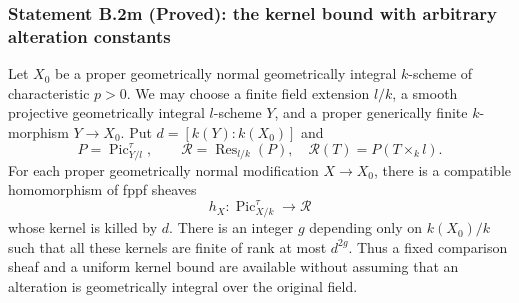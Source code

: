 \subsubsection*{Statement B.2m (Proved): the kernel bound with arbitrary alteration constants}
\begin{proposition}
\label{B:B2-alteration-constants}
Let $X_0$ be a proper geometrically normal geometrically integral
$k$-scheme of characteristic $p>0$.  We may choose a finite field
extension $l/k$, a smooth projective geometrically integral
$l$-scheme $Y$, and a proper generically finite $k$-morphism
$Y\to X_0$.  Put $d=[k(Y):k(X_0)]$ and
\[
 P=\operatorname{Pic}^{\tau}_{Y/l},\qquad
 \mathcal R=\operatorname{Res}_{l/k}(P),
 \quad\mathcal R(T)=P(T\times_k l).
\]
For each proper geometrically normal modification $X\to X_0$,
there is a compatible homomorphism of fppf sheaves
\[
 h_X:\operatorname{Pic}^{\tau}_{X/k}\longrightarrow\mathcal R
\]
whose kernel is killed by $d$.  There is an integer $g$ depending
only on $k(X_0)/k$ such that all these kernels are finite of rank
at most $d^{2g}$.  Thus a fixed comparison sheaf and a uniform
kernel bound are available without assuming that an alteration
is geometrically integral over the original field.
\end{proposition}
